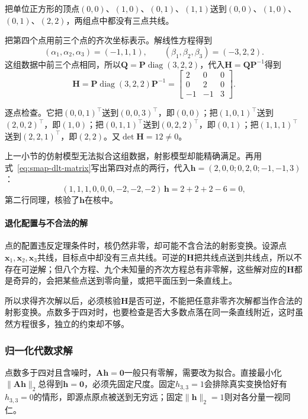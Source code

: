 \begin{example}[正方形到一般四边形]
\label{ex:smap-homography-square}
把单位正方形的顶点$(0,0)$、$(1,0)$、$(0,1)$、$(1,1)$送到$(0,0)$、$(1,0)$、$(0,1)$、$(2,2)$，两组点中都没有三点共线。

把第四个点用前三个点的齐次坐标表示。解线性方程得到
\[
 (\alpha_1,\alpha_2,\alpha_3)=(-1,1,1),\qquad(\beta_1,\beta_2,\beta_3)=(-3,2,2) .
\]
这组数据中前三个点相同，所以$\bm Q=\bm P\operatorname{diag}(3,2,2)$，代入$\bm H=\bm Q\bm P^{-1}$得到
\[
 \bm H=\bm P\operatorname{diag}(3,2,2)\bm P^{-1}
 =\begin{bmatrix}2&0&0\\0&2&0\\-1&-1&3\end{bmatrix}.
\]

逐点检查。它把$(0,0,1)^\top$送到$(0,0,3)^\top$，即$(0,0)$；把$(1,0,1)^\top$送到$(2,0,2)^\top$，即$(1,0)$；把$(0,1,1)^\top$送到$(0,2,2)^\top$，即$(0,1)$；把$(1,1,1)^\top$送到$(2,2,1)^\top$，即$(2,2)$。又$\det\bm H=12\neq0$。

上一小节的仿射模型无法拟合这组数据，射影模型却能精确满足。再用式~\eqref{eq:smap-dlt-matrix}写出第四对点的两行，代入$\bm h=(2,0,0;0,2,0;-1,-1,3)$：
\[
 (1,1,1,0,0,0,-2,-2,-2)\,\bm h=2+2+2-6=0 ,
\]
第二行同理，核验了$\bm h$在核中。
\end{example}

\paragraph{退化配置与不合法的解}

点的配置违反定理条件时，核仍然非零，却可能不含合法的射影变换。设源点$\bm x_1,\bm x_2,\bm x_3$共线，目标点中却没有三点共线。可逆的$\bm H$把共线点送到共线点，所以不存在可逆解；但八个方程、九个未知量的齐次方程总有非零解，这些解对应的$\bm H$都是奇异的，会把某些点送到零向量，或把平面压到一条直线上。

所以求得齐次解以后，必须核验$\bm H$是否可逆，不能把任意非零齐次解都当作合法的射影变换。点数多于四对时，也要检查是否大多数点落在同一条直线附近，这时虽然方程很多，独立的约束却不够。

\subsubsection{归一化代数求解}
\label{sec:smap-normalized-dlt}

点数多于四对且含噪时，$\bm A\bm h=\bm0$一般只有零解，需要改为拟合。直接最小化$\lVert\bm A\bm h\rVert_2$总得到$\bm h=\bm0$，必须先固定尺度。固定$h_{3,3}=1$会排除真实变换恰好有$h_{3,3}=0$的情形，即源点原点被送到无穷远；固定$\lVert\bm h\rVert_2=1$则对各分量一视同仁。

